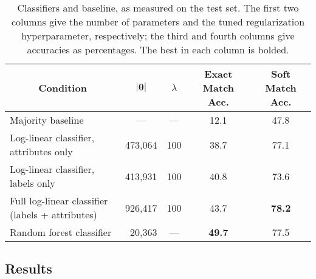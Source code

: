 \documentclass[11pt,letterpaper]{article}
\begin{document}
\begin{table*}\small\centering
\begin{tabular}{lrrcc}
\multicolumn{1}{c}{\bf Condition} & \multicolumn{1}{c}{$|\boldsymbol{\theta}|$} %
& \multicolumn{1}{c}{$\lambda$} 
& \multicolumn{1}{c}{\bf Exact Match Acc.} & \multicolumn{1}{c}{\bf Soft Match Acc.} 
\\
\midrule
Majority baseline & \multicolumn{1}{c}{---} & \multicolumn{1}{c}{---} %
& 12.1 & 47.8
\\
Log-linear classifier, attributes only & 473,064 & 100 & 38.7 & 77.1 \\
Log-linear classifier, labels only & 413,931 & 100 & 40.8 & 73.6  \\
Full log-linear classifier (labels + attributes) & 926,417 & 100 & 43.7 & \bf 78.2 \\
Random forest classifier & 20,363 & \multicolumn{1}{c}{---} & \bf 49.7 & 77.5 \\

\end{tabular}
\caption{Classifiers and baseline, as measured on the test set.
The first two columns give the number of parameters and the tuned regularization hyperparameter, respectively; 
the third and fourth columns give accuracies as percentages. The best in each column is bolded.}
\label{tbl:results}
\end{table*}




\subsection{Results}
\end{document}
